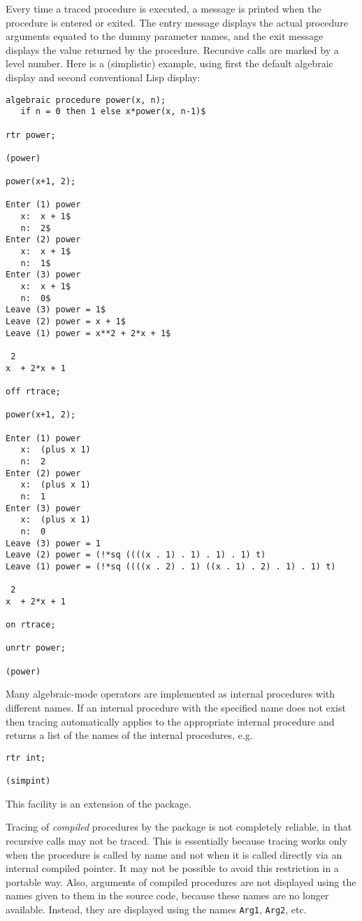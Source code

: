 Every time a traced procedure is executed, a message is printed when
the procedure is entered or exited.  The entry message displays the
actual procedure arguments equated to the dummy parameter names, and
the exit message displays the value returned by the procedure.
Recursive calls are marked by
a level number.  Here is a (simplistic) example, using first the
default algebraic display and second conventional Lisp display:
\begin{verbatim}
algebraic procedure power(x, n);
   if n = 0 then 1 else x*power(x, n-1)$

rtr power;

(power)

power(x+1, 2);

Enter (1) power
   x:  x + 1$
   n:  2$
Enter (2) power
   x:  x + 1$
   n:  1$
Enter (3) power
   x:  x + 1$
   n:  0$
Leave (3) power = 1$
Leave (2) power = x + 1$
Leave (1) power = x**2 + 2*x + 1$

 2
x  + 2*x + 1

off rtrace;

power(x+1, 2);

Enter (1) power
   x:  (plus x 1)
   n:  2
Enter (2) power
   x:  (plus x 1)
   n:  1
Enter (3) power
   x:  (plus x 1)
   n:  0
Leave (3) power = 1
Leave (2) power = (!*sq ((((x . 1) . 1) . 1) . 1) t)
Leave (1) power = (!*sq ((((x . 2) . 1) ((x . 1) . 2) . 1) . 1) t)

 2
x  + 2*x + 1

on rtrace;

unrtr power;

(power)
\end{verbatim}

Many algebraic-mode operators are implemented as internal procedures
with different names.  If an internal procedure with the specified
name does not exist then \rtrace{} tracing automatically applies to
the appropriate internal procedure and returns a list of the names of
the internal procedures, e.g.
\begin{verbatim}
rtr int;

(simpint)
\end{verbatim}
This facility is an extension of the \rdebug{} package.

Tracing of \emph{compiled} procedures by the \rtrace{} package is not
completely reliable, in that recursive calls may not be traced.  This
is essentially because tracing works only when the procedure is called
by name and not when it is called directly via an internal compiled
pointer.  It may not be possible to avoid this restriction in a
portable way.  Also, arguments of compiled procedures are not
displayed using the names given to them in the source code, because
these names are no longer available.  Instead, they are displayed
using the names \texttt{Arg1}, \texttt{Arg2}, etc.

